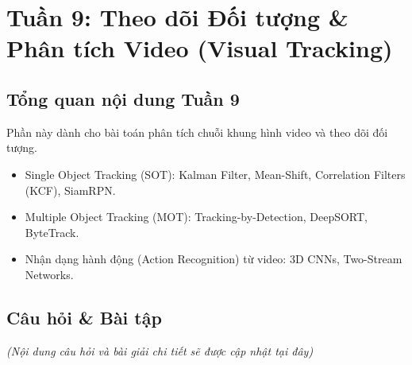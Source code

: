 \section{Tuần 9: Theo dõi Đối tượng \& Phân tích Video (Visual Tracking)}
\label{sec:week9}

\subsection{Tổng quan nội dung Tuần 9}
Phần này dành cho bài toán phân tích chuỗi khung hình video và theo dõi đối tượng.

\begin{itemize}
    \item Single Object Tracking (SOT): Kalman Filter, Mean-Shift, Correlation Filters (KCF), SiamRPN.
    \item Multiple Object Tracking (MOT): Tracking-by-Detection, DeepSORT, ByteTrack.
    \item Nhận dạng hành động (Action Recognition) từ video: 3D CNNs, Two-Stream Networks.
\end{itemize}

\subsection{Câu hỏi \& Bài tập}
\textit{(Nội dung câu hỏi và bài giải chi tiết sẽ được cập nhật tại đây)}
